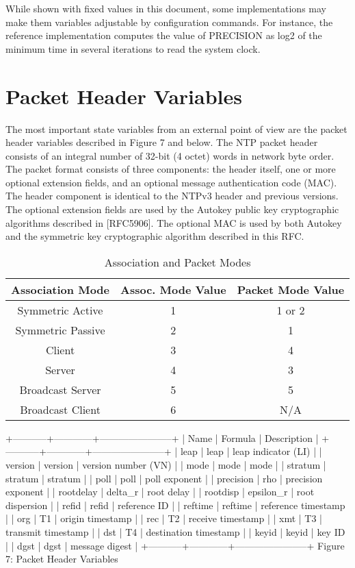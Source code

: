 While shown with fixed values in this document, some implementations
may make them variables adjustable by configuration commands. For
instance, the reference implementation computes the value of
PRECISION as log2 of the minimum time in several iterations to read
the system clock.

\section{Packet Header Variables}

The most important state variables from an external point of view are
the packet header variables described in Figure 7 and below. The NTP
packet header consists of an integral number of 32-bit (4 octet)
words in network byte order. The packet format consists of three
components: the header itself, one or more optional extension fields,
and an optional message authentication code (MAC). The header
component is identical to the NTPv3 header and previous versions.
The optional extension fields are used by the Autokey public key
cryptographic algorithms described in [RFC5906]. The optional MAC is
used by both Autokey and the symmetric key cryptographic algorithm
described in this RFC.

\begin{table}[htb]
\center
\begin{tabular}{c | c | c}
Association Mode & Assoc. Mode Value & Packet Mode Value \\
\hline
\hline
Symmetric Active & 1 & 1 or 2 \\
Symmetric Passive & 2 & 1 \\
Client & 3 & 4 \\
Server & 4 & 3 \\
Broadcast Server & 5 & 5 \\
Broadcast Client & 6 & N/A \\
\hline
\end{tabular}
\label{association_and_packet_modes}
\caption{Association and Packet Modes}
\end{table}

+-----------+------------+-----------------------+
| Name | Formula | Description |
+-----------+------------+-----------------------+
| leap | leap | leap indicator (LI) |
| version | version | version number (VN) |
| mode | mode | mode |
| stratum | stratum | stratum |
| poll | poll | poll exponent |
| precision | rho | precision exponent |
| rootdelay | delta\_r | root delay |
| rootdisp | epsilon\_r | root dispersion |
| refid | refid | reference ID |
| reftime | reftime | reference timestamp |
| org | T1 | origin timestamp |
| rec | T2 | receive timestamp |
| xmt | T3 | transmit timestamp |
| dst | T4 | destination timestamp |
| keyid | keyid | key ID |
| dgst | dgst | message digest |
+-----------+------------+-----------------------+
Figure 7: Packet Header Variables


